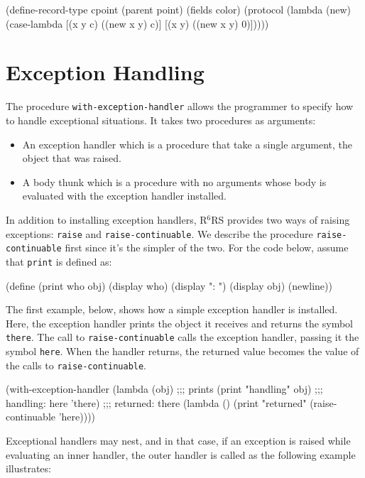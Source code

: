 \documentclass[onecolumn, 12pt, twoside, openright, dvipdfm]{book}
\newcommand{\rnrs}[1]{R$^{\mathrm{#1}}$RS}
\begin{document}
\begin{CodeInline}
(define-record-type cpoint
  (parent point) 
  (fields color) 
  (protocol
    (lambda (new) 
      (case-lambda 
        [(x y c) ((new x y) c)]
        [(x y)   ((new x y) 0)]))))
\end{CodeInline}


\section{Exception Handling}

The procedure \texttt{with-exception-handler} allows the programmer
to specify how to handle exceptional situations.  It takes two
procedures as arguments: 
\begin{itemize}
\item An exception handler which is a procedure that take a
single argument, the object that was raised.
\item A body thunk which is a procedure with no arguments whose body
is evaluated with the exception handler installed.
\end{itemize}

In addition to installing exception handlers, \rnrs{6} provides two
ways of raising exceptions: \texttt{raise} and
\texttt{raise-continuable}.  We describe the procedure
\texttt{raise-continuable} 
first since it's the simpler of the two.  
For the code below, assume that \texttt{print} is defined as:
\begin{CodeInline}
(define (print who obj)
  (display who) 
  (display ": ")
  (display obj)
  (newline))
\end{CodeInline}

The first example, below, shows how a simple exception handler is
installed.  Here, the exception handler prints the object it
receives and returns the symbol \texttt{there}.  The call to
\texttt{raise-continuable} calls the exception handler, passing it
the symbol \texttt{here}.  When the handler returns, the returned
value becomes the value of the calls to \texttt{raise-continuable}.

\begin{CodeInline}
(with-exception-handler
  (lambda (obj)                         ;;; prints
    (print "handling" obj)              ;;;   handling: here
    'there)                             ;;;   returned: there
  (lambda ()
    (print "returned" (raise-continuable 'here))))
\end{CodeInline}

Exceptional handlers may nest, and in that case, if an exception is
raised while evaluating an inner handler, the outer handler is
called as the following example illustrates:
\end{document}
